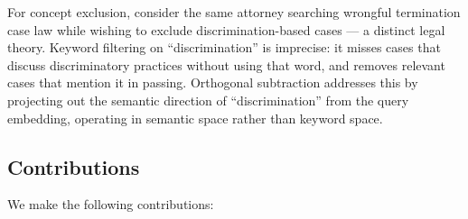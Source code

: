 \documentclass{article}
\begin{document}
For concept exclusion, consider the same attorney searching wrongful termination case law while wishing to exclude discrimination-based cases --- a distinct legal theory. Keyword filtering on ``discrimination'' is imprecise: it misses cases that discuss discriminatory practices without using that word, and removes relevant cases that mention it in passing. Orthogonal subtraction addresses this by projecting out the semantic direction of ``discrimination'' from the query embedding, operating in semantic space rather than keyword space.

\subsection{Contributions}

We make the following contributions:
\end{document}
